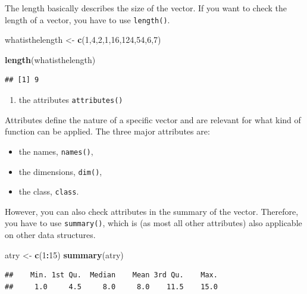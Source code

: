 \documentclass[]{report}
\newenvironment{Shaded}{\begin{snugshade}}{\end{snugshade}}
\newcommand{\KeywordTok}[1]{\textcolor[rgb]{0.13,0.29,0.53}{\textbf{#1}}}
\newcommand{\DecValTok}[1]{\textcolor[rgb]{0.00,0.00,0.81}{#1}}
\newcommand{\StringTok}[1]{\textcolor[rgb]{0.31,0.60,0.02}{#1}}
\newcommand{\OperatorTok}[1]{\textcolor[rgb]{0.81,0.36,0.00}{\textbf{#1}}}
\newcommand{\NormalTok}[1]{#1}
\providecommand{\tightlist}{%
  \setlength{\itemsep}{0pt}\setlength{\parskip}{0pt}}
\begin{document}
The length basically describes the size of the vector. If you want to
check the length of a vector, you have to use \texttt{length()}.

\begin{Shaded}
\begin{Highlighting}[]
\NormalTok{whatisthelength <-}\StringTok{ }\KeywordTok{c}\NormalTok{(}\DecValTok{1}\NormalTok{,}\DecValTok{4}\NormalTok{,}\DecValTok{2}\NormalTok{,}\DecValTok{1}\NormalTok{,}\DecValTok{16}\NormalTok{,}\DecValTok{124}\NormalTok{,}\DecValTok{54}\NormalTok{,}\DecValTok{6}\NormalTok{,}\DecValTok{7}\NormalTok{)}

\KeywordTok{length}\NormalTok{(whatisthelength)}
\end{Highlighting}
\end{Shaded}

\begin{verbatim}
## [1] 9
\end{verbatim}

\begin{enumerate}
\def\labelenumi{\arabic{enumi}.}
\setcounter{enumi}{2}
\tightlist
\item
  the attributes \texttt{attributes()}
\end{enumerate}

Attributes define the nature of a specific vector and are relevant for
what kind of function can be applied. The three major attributes are:

\begin{itemize}
\tightlist
\item
  the names, \texttt{names()},
\item
  the dimensions, \texttt{dim()},
\item
  the class, \texttt{class}.
\end{itemize}

However, you can also check attributes in the summary of the vector.
Therefore, you have to use \texttt{summary()}, which is (as most all
other attributes) also applicable on other data structures.

\begin{Shaded}
\begin{Highlighting}[]
\NormalTok{atry <-}\StringTok{ }\KeywordTok{c}\NormalTok{(}\DecValTok{1}\OperatorTok{:}\DecValTok{15}\NormalTok{)}
\KeywordTok{summary}\NormalTok{(atry)}
\end{Highlighting}
\end{Shaded}

\begin{verbatim}
##    Min. 1st Qu.  Median    Mean 3rd Qu.    Max. 
##     1.0     4.5     8.0     8.0    11.5    15.0
\end{verbatim}
\end{document}
